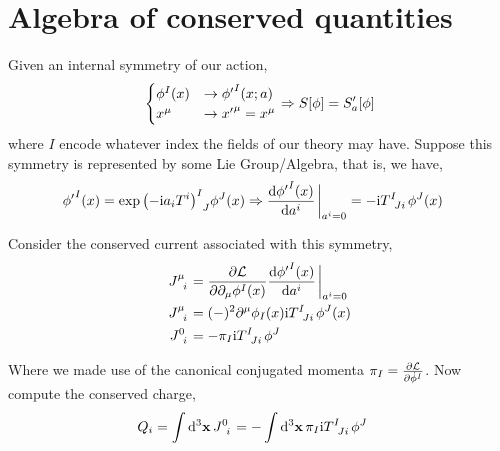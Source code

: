 \section{Algebra of conserved quantities}


Given an internal symmetry of our action,
\begin{align}
    \begin{cases}\phi^I\qty(x)&\rightarrow {\phi'}^I\qty(x;a)\\x^\mu&\rightarrow {x'}^\mu = x^\mu\end{cases}  
    \Rightarrow S[\phi]=S'_a[\phi]
\end{align}
where $I$ encode whatever index the fields of our theory may have. Suppose this symmetry is 
represented by some Lie Group/Algebra, that is, we have,
\begin{align}
    {\phi'}^I(x) &=\tensor{\exp\qty(-\im a_iT^i)}{^I_J}\phi^J\qty(x)\Rightarrow \dv{{\phi'}^I(x)}{a^i}\eval_{a^i=0}=-\im\tensor{T}{^I_J_i}\phi^J\qty(x)
\end{align}

Consider the conserved current associated with this symmetry,
\begin{align}
    \tensor{J}{^\mu_i} &=\pdv{\mathcal L}{\partial_\mu\phi^I\qty(x)}\dv{{\phi'}^I\qty(x)}{a^i}\eval_{a^i=0}\\
    \tensor{J}{^\mu_i} &=(-)^2\partial^\mu\phi_I\qty(x)\im\tensor{T}{^I_J_i}\phi^J\qty(x)\\
    \tensor{J}{^0_i} &=-\pi_I\im\tensor{T}{^I_J_i}\phi^J
\end{align}

Where we made use of the canonical conjugated momenta $\pi_I = \pdv{\mathcal L}{{\dot \phi}^I}$. Now compute the conserved charge,
\begin{align}
    Q_i&=\int\dd[3]{\vb x}\tensor{J}{^0_i}=-\int\dd[3]{\vb x}\pi_I\im\tensor{T}{^I_J_i}\phi^J
\end{align}

